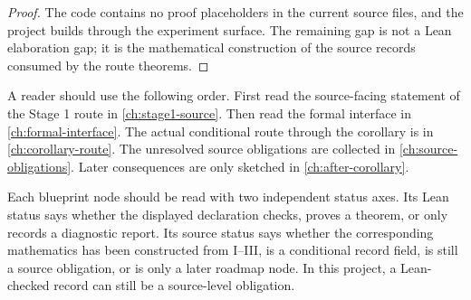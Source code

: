 \begin{proof}
  The code contains no proof placeholders in the current source files, and the
  project builds through the experiment surface.  The remaining gap is not a
  Lean elaboration gap; it is the mathematical construction of the source
  records consumed by the route theorems.
\end{proof}

\begin{definition}
  \label{def:read-order}
  A reader should use the following order.  First read the source-facing
  statement of the Stage 1 route in \cref{ch:stage1-source}.  Then read the
  formal interface in \cref{ch:formal-interface}.  The actual conditional
  route through the corollary is in \cref{ch:corollary-route}.  The unresolved
  source obligations are collected in \cref{ch:source-obligations}.  Later
  consequences are only sketched in \cref{ch:after-corollary}.
\end{definition}

\begin{definition}
  \label{def:two-status-axes}
  Each blueprint node should be read with two independent status axes.  Its
  Lean status says whether the displayed declaration checks, proves a theorem,
  or only records a diagnostic report.  Its source status says whether the
  corresponding mathematics has been constructed from \IUT{} I--III, is a
  conditional record field, is still a source obligation, or is only a later
  roadmap node.  In this project, a Lean-checked record can still be a
  source-level obligation.
\end{definition}
